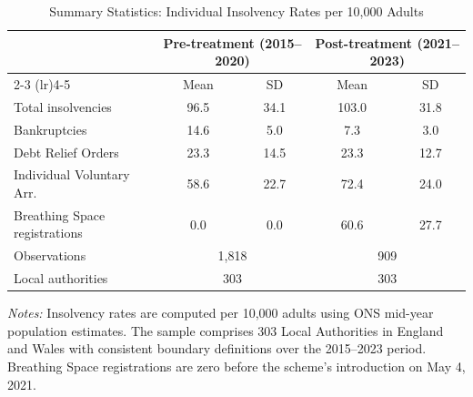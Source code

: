 \begin{table}[htbp]
\centering
\caption{Summary Statistics: Individual Insolvency Rates per 10,000 Adults}
\label{tab:summary}
\begin{tabular}{lcccc}
\hline\hline
 & \multicolumn{2}{c}{Pre-treatment (2015--2020)} & \multicolumn{2}{c}{Post-treatment (2021--2023)} \\
\cmidrule(lr){2-3} \cmidrule(lr){4-5}
 & Mean & SD & Mean & SD \\
\hline
Total insolvencies & 96.5 & 34.1 & 103.0 & 31.8 \\
\quad Bankruptcies & 14.6 & 5.0 & 7.3 & 3.0 \\
\quad Debt Relief Orders & 23.3 & 14.5 & 23.3 & 12.7 \\
\quad Individual Voluntary Arr. & 58.6 & 22.7 & 72.4 & 24.0 \\
Breathing Space registrations & 0.0 & 0.0 & 60.6 & 27.7 \\
\hline
Observations & \multicolumn{2}{c}{1,818} & \multicolumn{2}{c}{909} \\
Local authorities & \multicolumn{2}{c}{303} & \multicolumn{2}{c}{303} \\
\hline\hline
\end{tabular}
\par\vspace{0.3em}
{\footnotesize \textit{Notes:} Insolvency rates are computed per 10,000 adults using ONS mid-year population estimates. The sample comprises 303 Local Authorities in England and Wales with consistent boundary definitions over the 2015--2023 period. Breathing Space registrations are zero before the scheme's introduction on May 4, 2021.}
\end{table}

